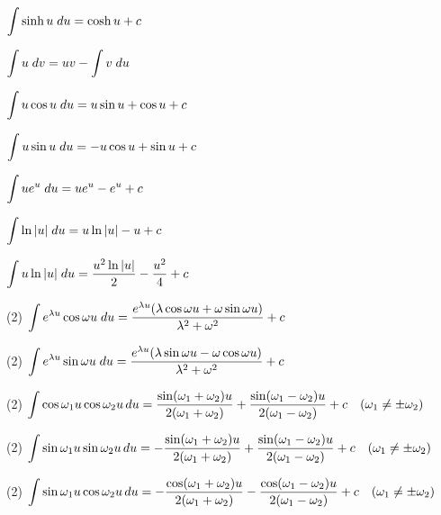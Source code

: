 \begin{enumext*}[label={},columns=2,itemsep=1.5ex]
\item $\displaystyle\int \sinh u\; du=\cosh u+c$

\item $\displaystyle\int u\; dv=uv-\int v\; du$

\item $\displaystyle\int u\cos u\; du=u\sin u +\cos u+c$

\item $\displaystyle\int u\sin u\; du=-u\cos u +\sin u+c$

\item $\displaystyle\int ue^u\; du=ue^{u}-e^{u} +c$

\item $\displaystyle\int \ln|u|\; du=u\ln|u|-u+c$

\item $\displaystyle\int u\ln|u|\; du=\frac{u^2\ln|u|}{2}-\frac{u^2}{4}+c$

\item(2) $\displaystyle\int e^{\lambda u}\cos\omega u\; du=\frac{e^{\lambda u}(\lambda\cos
\omega u+\omega\sin\omega u)}{\lambda^2+\omega^2}+c$

\item(2) $\displaystyle\int e^{\lambda u}\sin\omega u\; du=\frac{e^{\lambda u}(\lambda\sin
\omega u-\omega\cos\omega u)}{\lambda^2+\omega^2}+c$

\item(2) $\displaystyle\int\cos\omega_1u\cos\omega_2u\,du=\frac{\sin
(\omega_1+\omega_2)u}{2(\omega_1+\omega_2)}
+\frac{\sin(\omega_1-\omega_2)u}{2(\omega_1-\omega_2)}+c\quad
(\omega_1\ne\pm
\omega_2)$

\item(2) $\displaystyle\int\sin\omega_1 u\sin\omega_2 u\,du=
-\frac{\sin(\omega_1+\omega_2)u}{2(\omega_1+\omega_2)}
+\frac{\sin(\omega_1-\omega_2)u}{2(\omega_1-\omega_2)}+c
\quad
(\omega_1\ne\pm
\omega_2)$

\item(2) $\displaystyle\int\sin\omega_1u\cos\omega_2 u\,du=-\frac{\cos
(\omega_1+\omega_2)u}{2(\omega_1+\omega_2)}
-\frac{\cos(\omega_1-\omega_2)u}{2(\omega_1-\omega_2)}+c\quad
(\omega_1\ne\pm
\omega_2)$

\end{enumext*}
